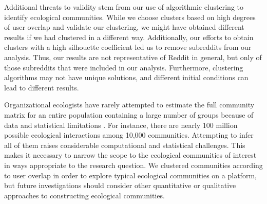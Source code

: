 \documentclass[letterpaper]{article}\usepackage[]{graphicx}\usepackage[]{color}
\begin{document}
Additional threats to validity stem from our use of algorithmic clustering to identify ecological communities.
While we choose clusters based on high degrees of user overlap and validate our clustering, we might have obtained different results if we had clustered in a different way. Additionally, our efforts to obtain clusters with a high silhouette coefficient led us to remove subreddits from our analysis. Thus, our results are not representative of Reddit in general, but only of those subreddits that were included in our analysis.
Furthermore, clustering algorithms may not have unique solutions, and different initial conditions can lead to different results. 


Organizational ecologists have rarely attempted to estimate the full community matrix for an entire population containing a large number of groups because of data and statistical limitations \cite[e.g.][]{ruef_emergence_2000, sorensen_recruitment-based_2004}. For instance, there are nearly 100 million possible ecological interactions among 10,000 communities.  Attempting to infer all of them raises considerable computational and statistical challenges.
This makes it necessary to narrow the scope to the ecological communities of interest in ways appropriate to the research question.
We clustered communities according to user overlap in order to explore typical ecological communities on a platform, but future investigations should consider other quantitative or qualitative approaches to constructing ecological communities.

\end{document}
